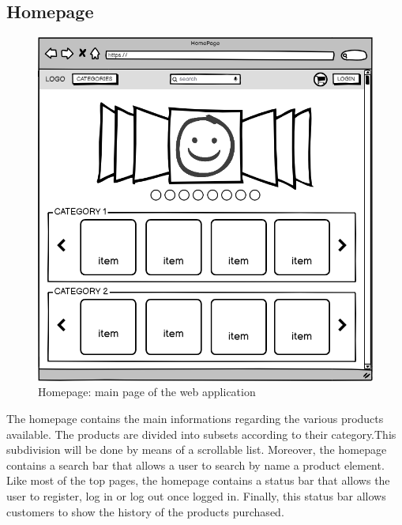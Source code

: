 \subsection{Homepage}
    \begin{figure}[H]
        \centering
        \includegraphics[width=\textwidth,height=0.7\textheight,keepaspectratio]{mockups/homepageMockup.png}
            \caption{Homepage: main page of the web application}
            \label{fig:Homepage}
    \end{figure}

The homepage contains the main informations regarding the various products available.
The products are divided into subsets according to their category.This subdivision will be done by means of a scrollable list. Moreover, the homepage contains a search bar that allows a user to search by name a product element.
Like most of the top pages, the homepage contains a status bar that allows the user to register, log in or log out once logged in.
Finally, this status bar allows customers to show the history of the products purchased.

